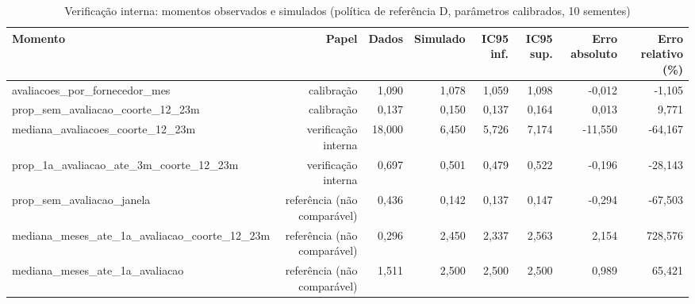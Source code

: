 \begin{table}[ht]
\centering
\caption{Verificação interna: momentos observados e simulados (política de referência D, parâmetros calibrados, 10 sementes)}
\label{tab:validacao}
\begin{tabular}{lrrrrrrr}
\hline
\textbf{Momento} & \textbf{Papel} & \textbf{Dados} & \textbf{Simulado} & \textbf{IC95 inf.} & \textbf{IC95 sup.} & \textbf{Erro absoluto} & \textbf{Erro relativo (\%)} \\
\hline
avaliacoes\_por\_fornecedor\_mes & calibração & 1,090 & 1,078 & 1,059 & 1,098 & -0,012 & -1,105 \\
prop\_sem\_avaliacao\_coorte\_12\_23m & calibração & 0,137 & 0,150 & 0,137 & 0,164 & 0,013 & 9,771 \\
mediana\_avaliacoes\_coorte\_12\_23m & verificação interna & 18,000 & 6,450 & 5,726 & 7,174 & -11,550 & -64,167 \\
prop\_1a\_avaliacao\_ate\_3m\_coorte\_12\_23m & verificação interna & 0,697 & 0,501 & 0,479 & 0,522 & -0,196 & -28,143 \\
prop\_sem\_avaliacao\_janela & referência (não comparável) & 0,436 & 0,142 & 0,137 & 0,147 & -0,294 & -67,503 \\
mediana\_meses\_ate\_1a\_avaliacao\_coorte\_12\_23m & referência (não comparável) & 0,296 & 2,450 & 2,337 & 2,563 & 2,154 & 728,576 \\
mediana\_meses\_ate\_1a\_avaliacao & referência (não comparável) & 1,511 & 2,500 & 2,500 & 2,500 & 0,989 & 65,421 \\
\hline
\end{tabular}
\end{table}
